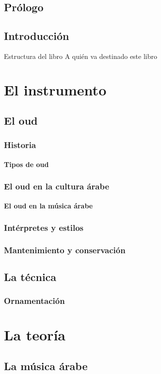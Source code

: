 	\chapter{Prólogo}
\chapter{Introducción}
	Estructura del libro
	A quién va destinado este libro
\part{El instrumento}
	\chapter{El oud}
		\section{Historia}
			\subsection{Tipos de oud}
		\section{El oud en la cultura árabe}
			\subsection{El oud en la música árabe}
			\section{Intérpretes y estilos}
		\section{Mantenimiento y conservación}
	\chapter{La técnica}
		\section{Ornamentación}
\part{La teoría}
	\chapter{La música árabe}
